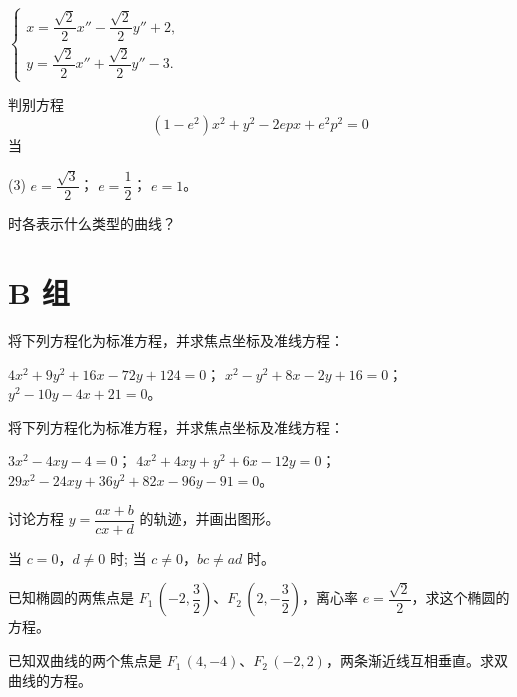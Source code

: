 \begin{question}
\begin{tasks}
    \task* $\begin{cases} x=\dfrac{\sqrt{2}}{2}x''-\dfrac{\sqrt{2}}{2}y''+2,\\y=\dfrac{\sqrt{2}}{2}x''+\dfrac{\sqrt{2}}{2}y''-3. \end{cases}$
  \end{tasks}
  \item 判别方程
  \[(1-e^2)x^2+y^2-2epx+e^2p^2=0\]
  当 
  \begin{tasks}(3)
    \task $e=\dfrac{\sqrt{3}}{2}$；
    \task $e=\dfrac{1}{2}$；
    \task $e=1$。
  \end{tasks}
  时各表示什么类型的曲线？
\end{question}
\section*{B 组}
\begin{question}[resume]
  \item 将下列方程化为标准方程，并求焦点坐标及准线方程：
  \begin{tasks}
    \task $4x^2+9y^2+16x-72y+124=0$；
    \task $x^2-y^2+8x-2y+16=0$；
    \task $y^2-10y-4x+21=0$。
  \end{tasks}
  \item 将下列方程化为标准方程，并求焦点坐标及准线方程：
  \begin{tasks}
    \task $3x^2-4xy-4=0$；
    \task $4x^2+4xy+y^2+6x-12y=0$；
    \task $29x^2-24xy+36y^2+82x-96y-91=0$。
  \end{tasks}
  \item 讨论方程 $y=\dfrac{ax+b}{cx+d}$ 的轨迹，并画出图形。
  \begin{tasks}
    \task 当 $c=0$，$d\neq0$ 时;
    \task 当 $c\neq 0$，$bc\neq ad$ 时。
  \end{tasks}
  \item 已知椭圆的两焦点是 $F_1\,(-2,\dfrac{3}{2})$、$F_2\,(2,-\dfrac{3}{2})$，离心率 $e=\dfrac{\sqrt{2}}{2}$，求这个椭圆的方程。
  \item 已知双曲线的两个焦点是 $F_1\,(4,-4)$、$F_2\,(-2,2)$，两条渐近线互相垂直。求双曲线的方程。
\end{question}
